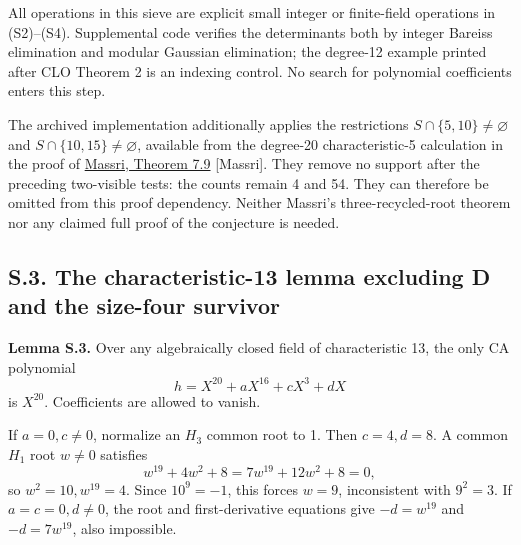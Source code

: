 \documentclass[
  british,
  10pt,
]{article}
\begin{document}
All operations in this sieve are explicit small integer or finite-field
operations in (S2)--(S4). Supplemental code verifies the determinants
both by integer Bareiss elimination and modular Gaussian elimination;
the degree-12 example printed after CLO Theorem 2 is an indexing
control. No search for polynomial coefficients enters this step.

The archived implementation additionally applies the restrictions
\(S\cap\{5,10\}\ne\varnothing\) and \(S\cap\{10,15\}\ne\varnothing\),
available from the degree-20 characteristic-5 calculation in the proof
of \href{https://arxiv.org/html/1806.09561v6}{Massri, Theorem 7.9}
{[}Massri{]}. They remove no support after the preceding two-visible
tests: the counts remain 4 and 54. They can therefore be omitted from
this proof dependency. Neither Massri's three-recycled-root theorem nor
any claimed full proof of the conjecture is needed.

\subsection{S.3. The characteristic-13 lemma excluding D and the
size-four
survivor}\label{s.3.-the-characteristic-13-lemma-excluding-d-and-the-size-four-survivor}

\textbf{Lemma S.3.} Over any algebraically closed field of
characteristic 13, the only CA polynomial \[
h=X^{20}+aX^{16}+cX^3+dX
\] is \(X^{20}\). Coefficients are allowed to vanish.

If \(a=0,c\ne0\), normalize an \(H_3\) common root to 1. Then
\(c=4,d=8\). A common \(H_1\) root \(w\ne0\) satisfies \[
w^{19}+4w^2+8=7w^{19}+12w^2+8=0,
\] so \(w^2=10,w^{19}=4\). Since \(10^9=-1\), this forces \(w=9\),
inconsistent with \(9^2=3\). If \(a=c=0,d\ne0\), the root and
first-derivative equations give \(-d=w^{19}\) and \(-d=7w^{19}\), also
impossible.
\end{document}
